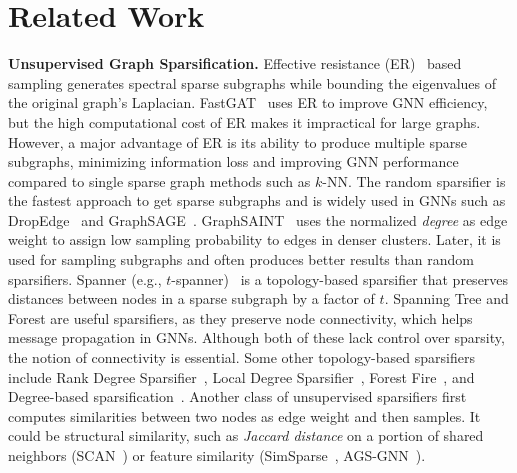 \section{Related Work}
\label{sec:related}



\noindent\textbf{Unsupervised Graph Sparsification.} 
Effective resistance (ER)~\cite{spielman2011graph} based sampling generates spectral sparse subgraphs while bounding the eigenvalues of the original graph's Laplacian. FastGAT~\cite{srinivasa2020fast} uses ER to improve GNN efficiency, but the high computational cost of ER makes it impractical for large graphs.  However, a major advantage of ER is its ability to produce multiple sparse subgraphs, minimizing information loss and improving GNN performance compared to single sparse graph methods such as $k$-NN.
The random sparsifier is the fastest approach to get sparse subgraphs and is widely used in GNNs such as DropEdge~\cite{rong2019dropedge} and GraphSAGE~\cite{hamilton2017inductive}. GraphSAINT~\cite{zeng2019graphsaint} uses the normalized \emph{degree} as edge weight to assign low sampling probability to edges in denser clusters. Later, it is used for sampling subgraphs and often produces better results than random sparsifiers. 
Spanner (e.g., $t$-spanner)~\cite{dragan2011spanners} is a topology-based sparsifier that preserves distances between nodes in a sparse subgraph by a factor of $t$. 
Spanning Tree and Forest are useful sparsifiers, as they preserve node connectivity, which helps message propagation in GNNs. Although both of these lack control over sparsity, the notion of connectivity is essential. %
Some other topology-based sparsifiers include  Rank Degree Sparsifier~\cite{voudigari2016rank}, Local Degree Sparsifier~\cite{hamann2016structure},
Forest Fire~\cite{leskovec2007graph}, and Degree-based sparsification~\cite{su2024generic, liu2023dspar}.
Another class of unsupervised sparsifiers first computes similarities between two nodes as edge weight and then 
samples. It could be structural similarity, such as \emph{Jaccard distance} on a portion of shared neighbors (SCAN~\cite{xu2007scan}) or feature similarity (SimSparse~\cite{wu2023alleviating}, AGS-GNN~\cite{das2024ags}).

